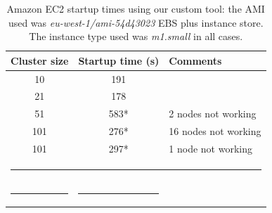 \begin{table}[h!]
\caption{Amazon EC2 startup times using our custom tool: the AMI used was \emph{eu-west-1/ami-54d43023} EBS plus instance store. The instance type used was \emph{m1.small} in all cases.}
\label{table:ec2}
%
\vspace{-0.5em}
%
\begin{center}
\begin{tabular}{ccl}
\toprule
Cluster size			& Startup time (s)	& Comments	  \\
\midrule
10                		& 191   		&	 \\
21                   		& 178			&        \\
51                   		& 583*			& 2 nodes not working       \\
101                  		& 276*			& 16 nodes not working       \\
101                  		& 297*			& 1 node not working       \\
%
\bottomrule
\multicolumn{3}{c}{\rule{0.98\textwidth}{0em}}\\
\rule{0.3\textwidth}{0cm} & \rule{0.3\textwidth}{0cm} &  \\
\end{tabular}
\end{center}
\end{table}

